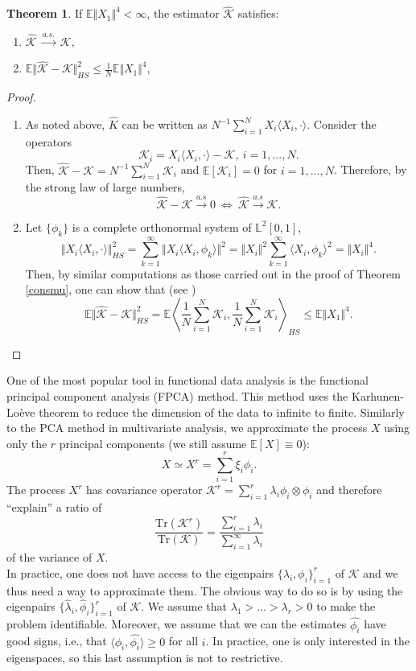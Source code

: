 \documentclass[10pt, a4paper]{report}
\newcommand{\E}[0]{\mathbb{E}}
\newcommand{\Ll}[0]{\mathbb{L}}
\newcommand{\K}[0]{\mathcal{K}}
\theoremstyle{definition}
\newtheorem{theorem}{Theorem}
\theoremstyle{remark}
\begin{document}
\begin{theorem}
	If $\E\Vert X_1\Vert^4 < \infty$, the estimator $\hat{\K}$ satisfies:
	\begin{enumerate}
		\item $\hat{\K} \ \stackrel{a.s.}{\longrightarrow} \ \K$,
		\item $\E\Vert \hat{\K}-\K \Vert^2_{HS} \leq \frac{1}{N}\E\Vert X_1\Vert^4$,
	\end{enumerate}
	\begin{proof}
		\begin{enumerate}
			\item As noted above, $\hat{K}$ can be written as $N^{-1}\sum_{i=1}^{N}X_i\langle X_i,\cdot \rangle$. Consider the operators 
			$$\K_i = X_i\langle X_i,\cdot \rangle - \K, \ i=1,...,N.$$
			Then, $\hat{\K} -\K = N^{-1}\sum_{i=1}^{N}\K_i$ and $\E[\K_i]=0$ for $i=1,...,N$. Therefore, by the strong law of large numbers,
			$$\hat{\K}-\K \stackrel{a.s}{\longrightarrow} 0 \ \iff \ \hat{\K} \stackrel{a.s}{\longrightarrow} \K.$$
			\item Let $\{\phi_k\}$ is a complete orthonormal system of $\Ll^2[0,1]$,
			$$\Vert X_i\langle X_i,\cdot \rangle\Vert_{HS}^2 = \sum_{k=1}^{\infty}\Vert X_i\langle X_i,\phi_k\rangle \Vert^2 = \Vert X_i \Vert^2 \sum_{k=1}^{\infty}\langle X_i,\phi_k\rangle^2 = \Vert X_i \Vert^4.$$
			Then, by similar computations as those carried out in the proof of Theorem \ref{consmu}, one can show that (see \cite[Theorem 2.5]{inference})
			$$\E\Vert \hat{\K}-\K \Vert^2_{HS} = \E\left\langle \frac{1}{N}\sum_{i=1}^{N} \K_i,\frac{1}{N}\sum_{i=1}^{N} \K_i \right\rangle_{HS} \leq \E\Vert X_1\Vert^4.$$
		\end{enumerate}
	\end{proof}
\end{theorem}
One of the most popular tool in functional data analysis is the functional principal component analysis (FPCA) method. This method uses the Karhunen-Loève theorem to reduce the dimension of the data to infinite to finite. Similarly to the PCA method in multivariate analysis, we approximate the process $X$ using only the $r$ principal components (we still assume $\E[X]\equiv 0$):
$$X \simeq X^r = \sum_{i=1}^{r}\xi_i \phi_i.$$
The process $X^r$ has covariance operator $\K^r = \sum_{i=1}^{r}\lambda_i \phi_i \otimes \phi_i$ and therefore ``explain'' a ratio of 
$$\frac{\mathrm{Tr}(\K^r)}{\mathrm{Tr}(\K)} = \frac{\sum_{i=1}^{r}\lambda_i}{\sum_{i=1}^{\infty}\lambda_i}$$
of the variance of $X$.\\
In practice, one does not have access to the eigenpairs $\{\lambda_i,\phi_i\}_{i=1}^r$ of $\K$ and we thus need a way to approximate them. The obvious way to do so is by using the eigenpairs $\{\hat{\lambda}_i,\hat{\phi}_i\}_{i=1}^r$ of $\K$. We assume that $\lambda_1>...>\lambda_r>0$ to make the problem identifiable. Moreover, we assume that we can the estimates $\hat{\phi_i}$ have good signs, i.e., that $\langle \phi_i,\hat{\phi_i}\rangle\geq 0$ for all $i$. In practice, one is only interested in the eigenspaces, so this last assumption is not to restrictive.\\
\end{document}
